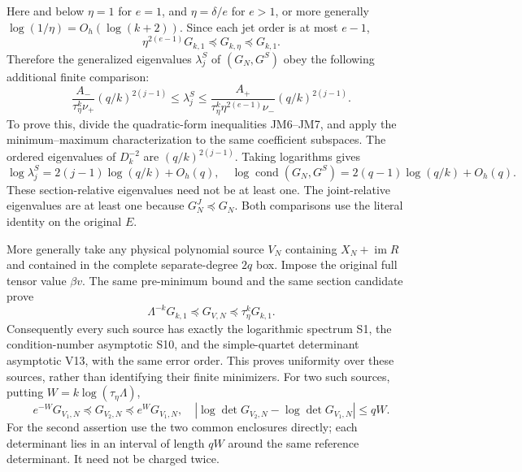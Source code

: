 Here and below $\eta=1$ for $e=1$, and $\eta=\delta/e$ for $e>1$,
or more generally $\log(1/\eta)=O_h(\log(k+2))$.
Since each jet order is at most $e-1$,
\[
 \eta^{2(e-1)}G_{k,1}\preceq G_{k,\eta}\preceq G_{k,1}.
 \tag{JM7}
\]
Therefore the generalized eigenvalues $\lambda^S_j$ of $(G_N,G^S)$
obey the following additional finite comparison:
\[
 \frac{A_-}{\tau_\eta^k\nu_+}(q/k)^{2(j-1)}
 \le\lambda^S_j\le
 \frac{A_+}{\tau_\eta^k\eta^{2(e-1)}\nu_-}(q/k)^{2(j-1)}.
 \tag{JM8}
\]
To prove this, divide the quadratic-form inequalities JM6--JM7,
and apply the minimum--maximum characterization to the same
coefficient subspaces. The ordered eigenvalues of $D_k^{-2}$ are
$(q/k)^{2(j-1)}$. Taking logarithms gives
\[
 \log\lambda^S_j=2(j-1)\log(q/k)+O_h(q),\quad
 \log\operatorname{cond}(G_N,G^S)
 =2(q-1)\log(q/k)+O_h(q).\tag{JM9}
\]
These section-relative eigenvalues need not be at least one.
The joint-relative eigenvalues are at least one because $G_N^J\preceq G_N$.
Both comparisons use the literal identity on the original $E$.

More generally take any physical polynomial source $V_N$ containing
$X_N+\operatorname{im}R$ and contained in the complete separate-degree
$2q$ box. Impose the original full tensor value $\beta v$.
The same pre-minimum bound and the same section candidate prove
\[
 \Lambda^{-k}G_{k,1}\preceq G_{V,N}\preceq\tau_\eta^kG_{k,1}.
 \tag{JM10}
\]
Consequently every such source has exactly the logarithmic spectrum
S1, the condition-number asymptotic S10, and the simple-quartet
determinant asymptotic V13, with the same error order. This proves
uniformity over these sources, rather than identifying their finite
minimizers. For two such sources, putting $W=k\log(\tau_\eta\Lambda)$,
\[
 e^{-W}G_{V_1,N}\preceq G_{V_2,N}\preceq e^WG_{V_1,N},\quad
 |\log\det G_{V_2,N}-\log\det G_{V_1,N}|\le qW.\tag{JM11}
\]
For the second assertion use the two common enclosures directly;
each determinant lies in an interval of length $qW$ around the
same reference determinant. It need not be charged twice.

